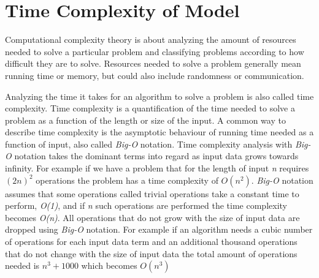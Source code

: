 \documentclass[a4paper,11pt]{kth-mag}
\begin{document}
\section{Time Complexity of Model}
Computational complexity theory is about analyzing the amount of resources needed to solve a particular problem and classifying problems according to how difficult they are to solve. Resources needed to solve a problem generally mean running time or memory, but could also include randomness or communication. 

Analyzing the time it takes for an algorithm to solve a problem is also called time complexity. Time complexity is a quantification of the time needed to solve a problem as a function of the length or size of the input. A common way to describe time complexity is the asymptotic behaviour of running time needed as a function of input, also called \textit{Big-O} notation. Time complexity analysis with \textit{Big-O} notation takes the dominant terms into regard as input data grows towards infinity. For example if we have a problem that for the length of input \textit{n} requires $(2n)^2$ operations the problem has a time complexity of $O(n^2)$. \textit{Big-O} notation assumes that some operations called trivial operations take a constant time to perform, \textit{O(1)}, and if \textit{n} such operations are performed the time complexity becomes \textit{O(n)}. All operations that do not grow with the size of input data are dropped using \textit{Big-O} notation. For example if an algorithm needs a cubic number of operations for each input data term and an additional thousand operations that do not change with the size of input data the total amount of operations needed is $n^3 + 1000$ which becomes $O(n^3)$
\end{document}
